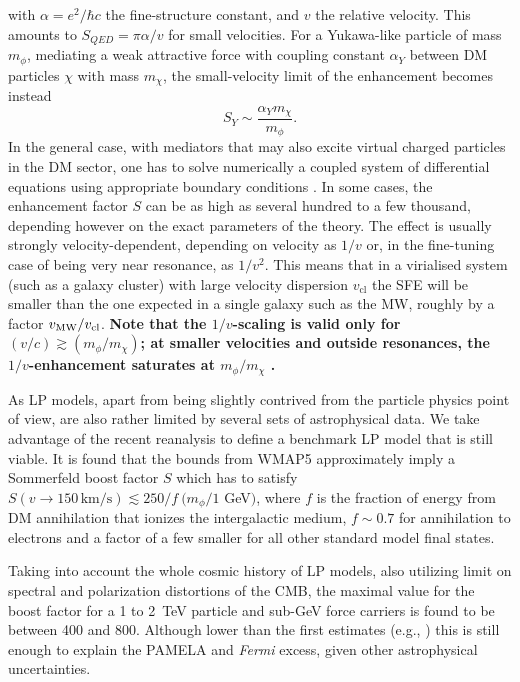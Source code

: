\documentclass[10pt,aps,pra,reprint,amsmath,amsfonts,amssymb,showpacs,nofootinbib,floatfix]{revtex4-1}
\def\C#1{{\bf #1}}
\newcommand{\Fermi}{{\em Fermi}\xspace}
\newcommand{\rmn}{\mathrm}
\newcommand{\sigv}{v_\rmn{cl}}
\begin{document}
with $\alpha =e^2/\hbar c$ the fine-structure constant, and $v$ the relative
velocity. This amounts to $S_{QED}=\pi\alpha/v$ for small velocities. For a
Yukawa-like particle of mass $m_\phi$, mediating a weak attractive force with
coupling constant $\alpha_Y$ between DM particles $\chi$ with mass
$m_\chi$, the small-velocity limit of the enhancement becomes instead
\begin{equation}
S_Y\sim\frac{\alpha_Y m_\chi}{m_\phi}.
\label{eq:saturation}
\end{equation}
In the general case, with mediators that may also excite virtual
charged particles in the DM sector, one has to solve numerically a
coupled system of differential equations using appropriate boundary
conditions
\cite{2005PhRvD..71f3528H,2007NuPhB.787..152C,2009PhRvD..79a5014A}. In
some cases, the enhancement factor $S$ can be as high as several
hundred to a few thousand, depending however on the exact parameters
of the theory. The effect is usually strongly velocity-dependent,
depending on velocity as $1/v$ or, in the fine-tuning case of being
very near resonance, as $1/v^2$. This means that in a virialised
system (such as a galaxy cluster) with large velocity dispersion
$\sigv$ the SFE will be smaller than the one expected in a single
galaxy such as the MW, roughly by a factor $v_{\rm MW}/\sigv$. \C{Note
  that the $1/v$-scaling is valid only for $(v/c) \gtrsim
  (m_\phi/m_\chi)$; at smaller velocities and outside resonances, the
  $1/v$-enhancement saturates at $m_\phi/m_\chi$
  \cite{2008PhRvL.101z1301K}.}

As LP models, apart from being slightly contrived from the particle
physics point of view, are also rather limited by several sets of
astrophysical data. We take advantage of the recent reanalysis
\cite{Finkbeiner:2010sm} to define a benchmark LP model that is still
viable.  It is found that the bounds from WMAP5 approximately imply a
Sommerfeld boost factor $S$ which has to satisfy $S(v\to
150\,\rmn{km}/\rmn{s})\lesssim 250/f\ (m_\phi/1$ GeV$)$, where $f$ is
the fraction of energy from DM annihilation that ionizes the
intergalactic medium, $f\sim 0.7$ for annihilation to electrons and a
factor of a few smaller for all other standard model final states.

Taking into account the whole cosmic history of LP models, also
utilizing limit on spectral and polarization distortions of the CMB,
the maximal value for the boost factor for a 1 to 2~TeV particle and
sub-GeV force carriers is found to be \cite{Finkbeiner:2010sm} between
400 and 800. Although lower than the first estimates (e.g.,
\cite{Bergstrom:2009fa,Meade:2009iu}) this is still enough to explain
the PAMELA and \Fermi excess, given other astrophysical uncertainties.
\end{document}
